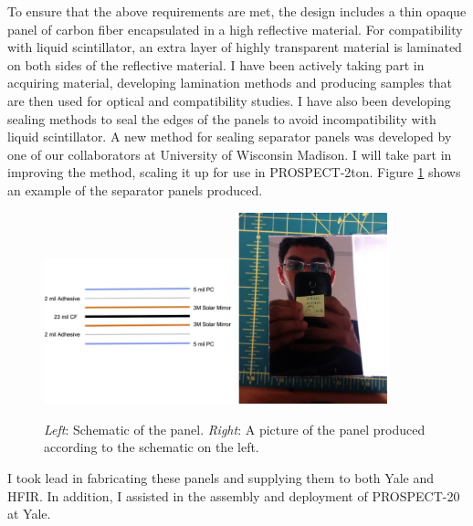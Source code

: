 \documentclass[11pt]{article}
\numberwithin{equation}{section}
\begin{document}
To ensure that the above requirements are met, the design includes a thin opaque panel of carbon fiber encapsulated in a high reflective material. For compatibility with liquid scintillator, an extra layer of highly transparent material is laminated on both sides of the reflective material. I have been actively taking part in acquiring  material, developing lamination methods and producing samples that are then used for optical and compatibility studies. I have also been developing sealing methods to seal the edges of the panels to avoid incompatibility with liquid scintillator. A new method for sealing separator panels was developed by one of our collaborators at University of Wisconsin Madison. I will take part in improving the method, scaling it up for use in PROSPECT-2ton. Figure \ref{fig:optical} shows an example of the separator panels produced.

 \begin{figure}[h]
\centering
\includegraphics*[width=0.49\textwidth]{./panelSchematic.PNG}
\includegraphics*[width=0.39\textwidth]{./panelPicture.PNG}
\caption[Separator panel]{\textit{Left}: Schematic of the panel. \textit{Right}: A picture of the panel produced according to the schematic on the left. }
\label{fig:optical}
\end{figure}
I took lead in fabricating these panels and supplying them to both Yale and HFIR. In addition, I assisted in the assembly and deployment of PROSPECT-20 at Yale.
\end{document}
